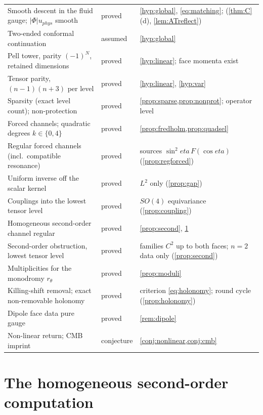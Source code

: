 \documentclass[11pt]{article}
\theoremstyle{canonmath}
\theoremstyle{canonpostulate}
\theoremstyle{canonproposition}
\theoremstyle{canonmath}
\theoremstyle{canonproposition}
\def\mathrm#1{#1}%
\def\eta{eta}%
\begin{document}
\begin{table}[H]
\begin{tabularx}{\textwidth}{>{\raggedright\arraybackslash}p{5.6cm} >{\raggedright\arraybackslash}p{2.2cm} >{\raggedright\arraybackslash}X}
Smooth descent in the fluid gauge; $|\Phi|u_{\mathrm{phys}}$ smooth & proved & \ref{hyp:global}, \eqref{eq:matching}; \cite[§4]{AnguigeTod1999a} (\cref{thm:C}(d), \cref{lem:ATreflect}) \\
Two-ended conformal continuation & assumed & \ref{hyp:global} \\
Pell tower, parity $(-1)^N$, retained dimensions & proved & \ref{hyp:linear}; face momenta exist \\
Tensor parity, $(n-1)(n+3)$ per level & proved & \ref{hyp:linear}, \ref{hyp:var} \\
Sparsity (exact level count); non-protection & proved & \cref{prop:sparse,prop:nonprot}; operator level \\
Forced channels; quadratic degrees $k\in\{0,4\}$ & proved & \cref{prop:fredholm,prop:quadsel} \\
Regular forced channels (incl.\ compatible resonance) & proved & sources $\sin^2\eta\,F(\cos\eta)$ (\cref{prop:regforced}) \\
Uniform inverse off the scalar kernel & proved & $L^2$ only (\cref{prop:gap}) \\
Couplings into the lowest tensor level & proved & $SO(4)$ equivariance (\cref{prop:coupling}) \\
Homogeneous second-order channel regular & proved & \cref{prop:second}, \cref{app:b9} \\
Second-order obstruction, lowest tensor level & proved & families $C^2$ up to both faces; $n=2$ data only (\cref{prop:second}) \\
Multiplicities for the monodromy $r_\theta$ & proved & \cref{prop:moduli} \\
Killing-shift removal; exact non-removable holonomy & proved & criterion \eqref{eq:holonomy}; round cycle (\cref{prop:holonomy}) \\
Dipole face data pure gauge & proved & \cref{rem:dipole} \\
Non-linear return; CMB imprint & conjecture & \cref{conj:nonlinear,conj:cmb} \\
\bottomrule
\end{tabularx}
\end{table}

\newpage
\appendix
\section{The homogeneous second-order computation}
\label{app:b9}
\end{document}
